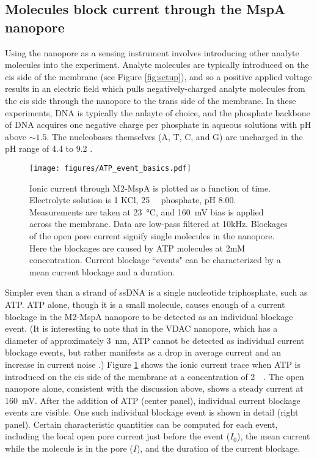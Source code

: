 \subsection{Molecules block current through the MspA nanopore}

Using the nanopore as a sensing instrument involves introducing other analyte molecules into the experiment.  Analyte molecules are typically introduced on the cis side of the membrane (see Figure \ref{fig:setup}), and so a positive applied voltage results in an electric field which pulls negatively-charged analyte molecules from the cis side through the nanopore to the trans side of the membrane.  In these experiments, DNA is typically the anlayte of choice, and the phosphate backbone of DNA acquires one negative charge per phosphate in aqueous solutions with pH above $\sim 1.5$.  The nucleobases themselves (A, T, C, and G) are uncharged in the pH range of \num{4.4} to \num{9.2} \citep{Verdolino2008, Acharya2004}.

\begin{figure}[h]
\begin{centering}
\texttt{[image: figures/ATP\_event\_basics.pdf]}
\caption[Current blockage events in the MspA nanopore]{Ionic current through M2-MspA is plotted as a function of time.  Electrolyte solution is \SI{1}{\Molar} KCl, \SI{25}{\milli\Molar} phosphate, pH \num{8.00}.  Measurements are taken at \SI{23}{\degreeCelsius}, and \SI{160}{\mV} bias is applied across the membrane.  Data are low-pass filtered at 10kHz.  Blockages of the open pore current signify single molecules in the nanopore.  Here the blockages are caused by ATP molecules at 2mM concentration.  Current blockage ``events" can be characterized by a mean current blockage and a duration.}
\label{fig:mspa_event_basics}
\end{centering}
\end{figure}

Simpler even than a strand of ssDNA is a single nucleotide triphosphate, such as ATP.  ATP alone, though it is a small molecule, causes enough of a current blockage in the M2-MspA nanopore to be detected as an individual blockage event.  (It is interesting to note that in the VDAC nanopore, which has a diameter of approximately \SI{3}{\nm}, ATP cannot be detected as individual current blockage events, but rather manifests as a drop in average current and an increase in current noise \citep{Rostovtseva1998, Rostovtseva2002}.)  Figure \ref{fig:mspa_event_basics} shows the ionic current trace when ATP is introduced on the cis side of the membrane at a concentration of \SI{2}{\milli\Molar}.  The open nanopore alone, consistent with the discussion above, shows a steady current at \SI{160}{\mV}.  After the addition of ATP (center panel), individual current blockage events are visible.  One such individual blockage event is shown in detail (right panel).  Certain characteristic quantities can be computed for each event, including the local open pore current just before the event ($I_0$), the mean current while the molecule is in the pore ($I$), and the duration of the current blockage.

